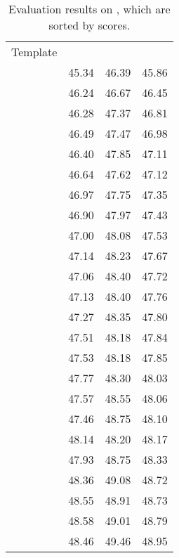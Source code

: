 \documentclass[11pt]{article}
\begin{document}
\begin{table*}[]
\small
    \centering
    \begin{tabular}{c|ccc}
    \toprule
    \multirow{2}{*}{Template} & \multicolumn{3}{c}{} \\ 
    &  &  &  \\
    \midrule
        & 45.34 & 46.39 & 45.86 \\
        & 46.24 & 46.67 & 46.45 \\
        & 46.28 & 47.37 & 46.81 \\
        & 46.49 & 47.47 & 46.98 \\
        & 46.40 & 47.85 & 47.11 \\
        & 46.64 & 47.62 & 47.12 \\
        & 46.97 & 47.75 & 47.35 \\
        & 46.90 & 47.97 & 47.43 \\
        & 47.00 & 48.08 & 47.53 \\
        & 47.14 & 48.23 & 47.67 \\
        & 47.06 & 48.40 & 47.72 \\
        & 47.13 & 48.40 & 47.76 \\
        & 47.27 & 48.35 & 47.80 \\
        & 47.51 & 48.18 & 47.84 \\
        & 47.53 & 48.18 & 47.85 \\
        & 47.77 & 48.30 & 48.03 \\
        & 47.57 & 48.55 & 48.06 \\
        & 47.46 & 48.75 & 48.10 \\
        & 48.14 & 48.20 & 48.17 \\
        & 47.93 & 48.75 & 48.33 \\
        & 48.36 & 49.08 & 48.72 \\
        & 48.55 & 48.91 & 48.73 \\
        & 48.58 & 49.01 & 48.79 \\
        & 48.46 & 49.46 & 48.95 \\
\bottomrule
    \end{tabular}
    \caption{Evaluation results on , which are sorted by  scores.}
    \label{table:rest15_appendix}
\end{table*}
\end{document}
